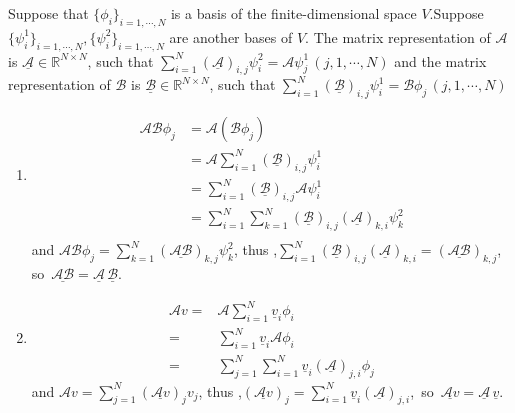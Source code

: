 \documentclass{article}
\begin{document}
Suppose that $\{\phi_i\}_{i=1,\cdots,N}$ is a basis of the finite-dimensional space $V$.Suppose $\{\psi_i^1\}_{i=1,\cdots, N},\{\psi_i^2\}_{i=1,\cdots, N}$
are another bases of $V$. The matrix representation of $\mathcal{A}$ is $\underline{\mathcal{A}}\in\mathbb{R}^{N\times N}$,  such that $\sum_{i=1}^N (\underline{\mathcal{A}})_{i,j}\psi^2 _i=\mathcal{A}\psi^1_j\, (j,1,\cdots,N)$
and the matrix representation of $\mathcal{B}$ is $\underline{\mathcal{B}}\in\mathbb{R}^{N\times N}$, such that  $\sum_{i=1}^N (\underline{\mathcal{B}})_{i,j}\psi^1 _i=\mathcal{B}\phi_j\, (j,1,\cdots,N)$
\begin{enumerate}[1.]
    \item \begin{equation*}
              \begin{aligned}
                  \mathcal{AB}\phi_j & =\mathcal{A}(\mathcal{B}\phi_j)                                                                   \\
                                     & =\mathcal{A}\sum_{i=1}^N (\underline{\mathcal{B}})_{i,j}\psi^1 _i                                 \\
                                     & =\sum_{i=1}^N (\underline{\mathcal{B}})_{i,j}\mathcal{A}\psi^1 _i                                 \\
                                     & =\sum_{i=1}^N\sum_{k=1}^N (\underline{\mathcal{B}})_{i,j}(\underline{\mathcal{A}})_{k,i}\psi^2 _k \\
              \end{aligned}
          \end{equation*}
          and $\mathcal{AB}\phi_j=\sum_{k=1}^N (\underline{\mathcal{AB}})_{k,j}\psi^2_k$,
          thus ,$\sum_{i=1}^N (\underline{\mathcal{B}})_{i,j}(\underline{\mathcal{A}})_{k,i}= (\underline{\mathcal{AB}})_{k,j}$,\, so\,
          $\underline{\mathcal{AB}}=\underline{\mathcal{A}}\, \underline{\mathcal{B}}.$
    \item \begin{equation*}
              \begin{aligned}
                  \mathcal{A}v= & \mathcal{A}\sum_{i=1}^N \underline{v}_i\phi_i                                 \\
                  =             & \sum_{i=1}^N \underline{v}_i\mathcal{A}\phi_i                                 \\
                  =             & \sum_{j=1}^N\sum_{i=1}^N \underline{v}_i(\underline{\mathcal{A}})_{j,i}\phi_j
              \end{aligned}
          \end{equation*}
          and $\mathcal{A}v=\sum_{j=1}^N (\underline{\mathcal{A}v})_{j}v_j$,
          thus ,$(\underline{\mathcal{A}v})_{j}=\sum_{i=1}^N \underline{v}_i(\underline{\mathcal{A}})_{j,i}$,\, so\,
          $\underline{\mathcal{A}v}=\underline{\mathcal{A}}\, \underline{v}.$


\end{enumerate}
\end{document}
